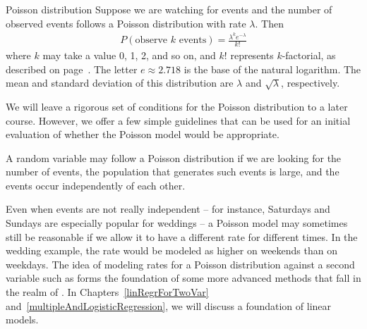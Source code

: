 \begin{onebox}{Poisson distribution}
  Suppose we are watching for events and the number
  of observed events follows a Poisson distribution
  with rate $\lambda$.
  Then
  \begin{align*}
  P(\text{observe $k$ events})
      = \frac{\lambda^{k} e^{-\lambda}}{k!}
  \end{align*}
  where $k$ may take a value 0, 1, 2, and so on,
  and $k!$ represents $k$-factorial, as described on
  page~\pageref{factorial_defined}.
  The letter $e\approx2.718$ is the base of the natural
  logarithm.
  The mean and standard deviation of this distribution
  are $\lambda$ and $\sqrt{\lambda}$, respectively.
\end{onebox}

We will leave a rigorous set of conditions for the Poisson distribution to a later course. However, we offer a few simple guidelines that can be used for an initial evaluation of whether the Poisson model would be appropriate.

A random variable may follow a Poisson distribution if we are looking for the number of events, the population that generates such events is large, and the events occur independently of each other.

Even when events are not really independent -- for instance, Saturdays and Sundays are especially popular for weddings -- a Poisson model may sometimes still be reasonable if we allow it to have a different rate for different times. In the wedding example, the rate would be modeled as higher on weekends than on weekdays. The idea of modeling rates for a Poisson distribution against a second variable such as  forms the foundation of some more advanced methods that fall in the realm of . In Chapters~\ref{linRegrForTwoVar} and~\ref{multipleAndLogisticRegression}, we will discuss a foundation of linear models.



{}
